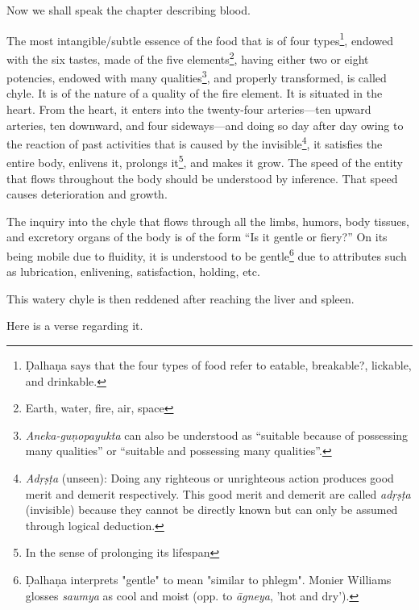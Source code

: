 \begin{translation}    
\item [1] Now we shall speak the chapter describing blood.

\item [2]

    
\item [3]    
    The most intangible/subtle essence of the food that is of four types\footnote{Ḍalhaṇa says that the four types of food refer to eatable, breakable?, lickable, and drinkable.}, endowed with the six tastes, made of the five elements\footnote{Earth, water, fire, air, space}, having either two or eight potencies, endowed with many qualities\footnote{\emph{Aneka-guṇopayukta} can also be understood as “suitable because of possessing many qualities” or “suitable and possessing many qualities”.}, and properly transformed, is called chyle. It is of the nature of a quality of the fire element. It is situated in the heart. From the heart, it enters into the twenty-four arteries—ten upward arteries, ten downward, and four sideways—and doing so day after day owing to the reaction of past activities that is caused by the invisible\footnote{\emph{Adṛṣṭa} (unseen): Doing any righteous or unrighteous action produces good merit and demerit respectively. This good merit and demerit are called \emph{adṛṣṭa} (invisible) because they cannot be directly known but can only be assumed through logical deduction.}, it satisfies the entire body, enlivens it, prolongs it\footnote{In the sense of prolonging its lifespan}, and makes it grow. The speed of the entity that flows throughout the body should be understood by inference. That speed causes deterioration and growth. 
    
    The inquiry into the chyle that flows through all the limbs, humors, body tissues, and excretory organs of the body is of the form “Is it gentle or fiery?” On its being mobile due to fluidity, it is understood to be gentle\footnote{Ḍalhaṇa interprets "gentle" to mean "similar to phlegm". Monier Williams glosses \emph{saumya} as cool and moist (opp. to \emph{āgneya}, 'hot and dry').} due to attributes such as lubrication, enlivening, satisfaction, holding, etc. 
    
\item [4]  
This watery chyle is then reddened after reaching the liver and spleen.

\item [5]
Here is a verse regarding it.


\end{translation}
